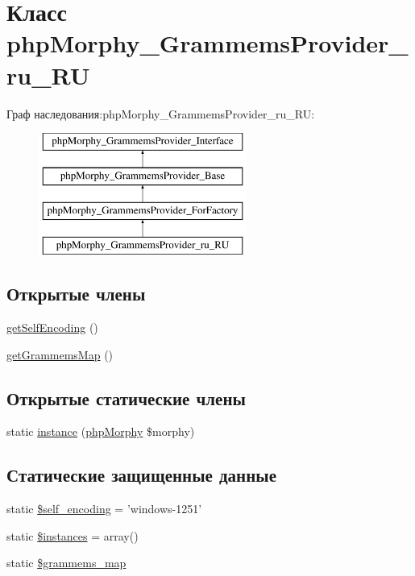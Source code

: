 \hypertarget{classphpMorphy__GrammemsProvider__ru__RU}{
\section{Класс phpMorphy\_\-GrammemsProvider\_\-ru\_\-RU}
\label{classphpMorphy__GrammemsProvider__ru__RU}
}
Граф наследования:phpMorphy\_\-GrammemsProvider\_\-ru\_\-RU:\begin{figure}[H]
\begin{center}
\leavevmode
\includegraphics[height=4.000000cm]{classphpMorphy__GrammemsProvider__ru__RU}
\end{center}
\end{figure}
\subsection*{Открытые члены}
\begin{DoxyCompactItemize}
\item 
\hyperlink{classphpMorphy__GrammemsProvider__ru__RU_ad0a1eeecb761ec8a0f2a5ad3bac73814}{getSelfEncoding} ()
\item 
\hyperlink{classphpMorphy__GrammemsProvider__ru__RU_a52c8af2256c2c2edc4d8a0924e147ac1}{getGrammemsMap} ()
\end{DoxyCompactItemize}
\subsection*{Открытые статические члены}
\begin{DoxyCompactItemize}
\item 
static \hyperlink{classphpMorphy__GrammemsProvider__ru__RU_a419b781280c12c867f40688681ca35d9}{instance} (\hyperlink{classphpMorphy}{phpMorphy} \$morphy)
\end{DoxyCompactItemize}
\subsection*{Статические защищенные данные}
\begin{DoxyCompactItemize}
\item 
static \hyperlink{classphpMorphy__GrammemsProvider__ru__RU_a137fa080ffa6a569a1a28c16c721a7f9}{\$self\_\-encoding} = 'windows-\/1251'
\item 
static \hyperlink{classphpMorphy__GrammemsProvider__ru__RU_abc4de470d7089d6299a8a3d663bc1476}{\$instances} = array()
\item 
static \hyperlink{classphpMorphy__GrammemsProvider__ru__RU_a9b776427d1e20f10dbdb3a0bced975d5}{\$grammems\_\-map}
\end{DoxyCompactItemize}


